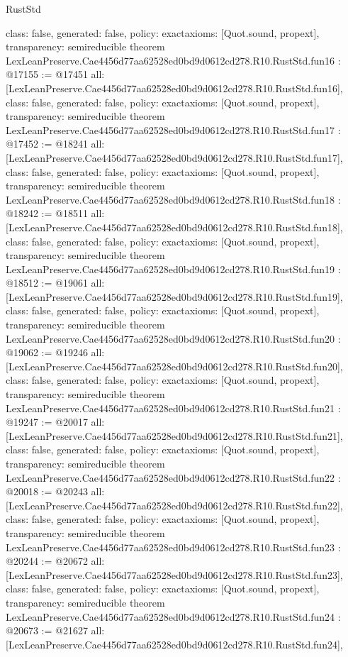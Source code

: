 \begin{lexlean}{RustStd}
\begin{coremodule}
{  class: false,
  generated: false,
  policy: exact{axioms: [Quot.sound, propext]},
  transparency: semireducible
}
theorem LexLeanPreserve.Cae4456d77aa62528ed0bd9d0612cd278.R10.RustStd.fun16 : @17155 := @17451 {
  all: [LexLeanPreserve.Cae4456d77aa62528ed0bd9d0612cd278.R10.RustStd.fun16],
  class: false,
  generated: false,
  policy: exact{axioms: [Quot.sound, propext]},
  transparency: semireducible
}
theorem LexLeanPreserve.Cae4456d77aa62528ed0bd9d0612cd278.R10.RustStd.fun17 : @17452 := @18241 {
  all: [LexLeanPreserve.Cae4456d77aa62528ed0bd9d0612cd278.R10.RustStd.fun17],
  class: false,
  generated: false,
  policy: exact{axioms: [Quot.sound, propext]},
  transparency: semireducible
}
theorem LexLeanPreserve.Cae4456d77aa62528ed0bd9d0612cd278.R10.RustStd.fun18 : @18242 := @18511 {
  all: [LexLeanPreserve.Cae4456d77aa62528ed0bd9d0612cd278.R10.RustStd.fun18],
  class: false,
  generated: false,
  policy: exact{axioms: [Quot.sound, propext]},
  transparency: semireducible
}
theorem LexLeanPreserve.Cae4456d77aa62528ed0bd9d0612cd278.R10.RustStd.fun19 : @18512 := @19061 {
  all: [LexLeanPreserve.Cae4456d77aa62528ed0bd9d0612cd278.R10.RustStd.fun19],
  class: false,
  generated: false,
  policy: exact{axioms: [Quot.sound, propext]},
  transparency: semireducible
}
theorem LexLeanPreserve.Cae4456d77aa62528ed0bd9d0612cd278.R10.RustStd.fun20 : @19062 := @19246 {
  all: [LexLeanPreserve.Cae4456d77aa62528ed0bd9d0612cd278.R10.RustStd.fun20],
  class: false,
  generated: false,
  policy: exact{axioms: [Quot.sound, propext]},
  transparency: semireducible
}
theorem LexLeanPreserve.Cae4456d77aa62528ed0bd9d0612cd278.R10.RustStd.fun21 : @19247 := @20017 {
  all: [LexLeanPreserve.Cae4456d77aa62528ed0bd9d0612cd278.R10.RustStd.fun21],
  class: false,
  generated: false,
  policy: exact{axioms: [Quot.sound, propext]},
  transparency: semireducible
}
theorem LexLeanPreserve.Cae4456d77aa62528ed0bd9d0612cd278.R10.RustStd.fun22 : @20018 := @20243 {
  all: [LexLeanPreserve.Cae4456d77aa62528ed0bd9d0612cd278.R10.RustStd.fun22],
  class: false,
  generated: false,
  policy: exact{axioms: [Quot.sound, propext]},
  transparency: semireducible
}
theorem LexLeanPreserve.Cae4456d77aa62528ed0bd9d0612cd278.R10.RustStd.fun23 : @20244 := @20672 {
  all: [LexLeanPreserve.Cae4456d77aa62528ed0bd9d0612cd278.R10.RustStd.fun23],
  class: false,
  generated: false,
  policy: exact{axioms: [Quot.sound, propext]},
  transparency: semireducible
}
theorem LexLeanPreserve.Cae4456d77aa62528ed0bd9d0612cd278.R10.RustStd.fun24 : @20673 := @21627 {
  all: [LexLeanPreserve.Cae4456d77aa62528ed0bd9d0612cd278.R10.RustStd.fun24],
}
\end{coremodule}
\end{lexlean}
